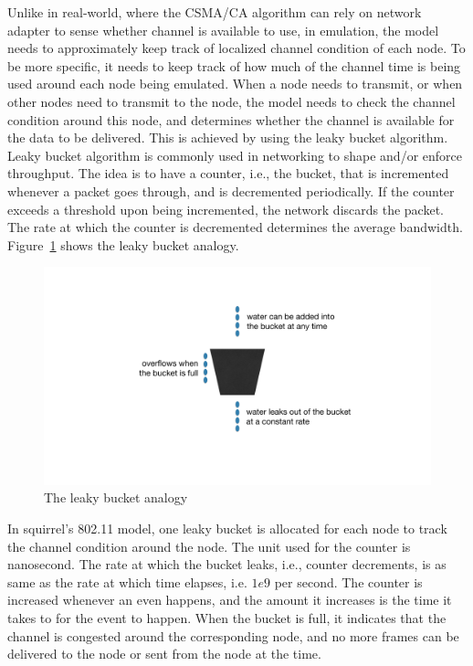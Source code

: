 \documentclass[12pt]{report}
\begin{document}
Unlike in real-world, where the CSMA/CA algorithm can rely on network adapter to sense whether channel is available to use, in emulation, the model needs to approximately keep track of localized channel condition of each node. To be more specific, it needs to keep track of how much of the channel time is being used around each node being emulated. When a node needs to transmit, or when other nodes need to transmit to the node, the model needs to check the channel condition around this node, and determines whether the channel is available for the data to be delivered. This is achieved by using the leaky bucket algorithm. Leaky bucket algorithm \cite{turner1986,yin1991} is commonly used in networking to shape and/or enforce throughput. The idea is to have a counter, i.e., the bucket, that is incremented whenever a packet goes through, and is decremented periodically. If the counter exceeds a threshold upon being incremented, the network discards the packet. The rate at which the counter is decremented determines the average bandwidth. Figure~\ref{fig:leaky_bucket} shows the leaky bucket analogy.

\begin{figure}[h]
  \begin{center}
    \includegraphics[width=.7\textwidth]{figures/leakyBucket.pdf}
    \caption{\label{fig:leaky_bucket}The leaky bucket analogy}
  \end{center}
\end{figure}

In squirrel's 802.11 model, one leaky bucket is allocated for each node to track the channel condition around the node. The unit used for the counter is nanosecond. The rate at which the bucket leaks, i.e., counter decrements, is as same as the rate at which time elapses, i.e. $1e9$ per second. The counter is increased whenever an even happens, and the amount it increases is the time it takes to for the event to happen. When the bucket is full, it indicates that the channel is congested around the corresponding node, and no more frames can be delivered to the node or sent from the node at the time.
\end{document}

